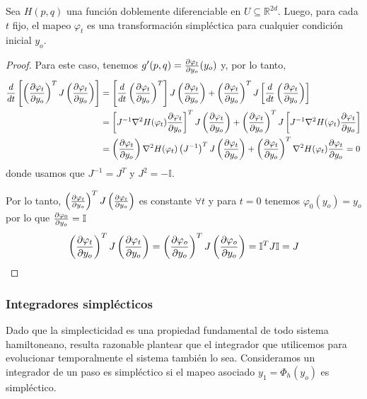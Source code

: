 \begin{theorem}{\label{teo:preservacion_evol}}
  Sea $H(p,q)$ una función doblemente diferenciable en $U\subseteq\mathbb{R}^{2d}$. Luego, para cada $t$ fijo, el mapeo $\varphi_t$ es una transformación simpléctica
  para cualquier condición inicial $y_o$.
\end{theorem}
\begin{proof}
 Para este caso, tenemos $g'(p,q) = \frac{\partial\varphi_t}{\partial y_o}(y_o)$ y, por lo tanto,
 \begin{align*}
  \frac{d}{dt}\left[ \left(\frac{\partial\varphi_t}{\partial y_o}\right)^T J \left(\frac{\partial\varphi_t}{\partial y_o}\right) \right] 
  &= \left[\frac{d}{dt}\left(\frac{\partial\varphi_t}{\partial y_o}\right)^T\right] J \left(\frac{\partial\varphi_t}{\partial y_o}\right) + \left(\frac{\partial\varphi_t}{\partial y_o}\right)^T J \left[\frac{d}{dt}\left(\frac{\partial\varphi_t}{\partial y_o}\right)\right] \\
  &= \left[J^{-1} \nabla^2 H(\varphi_t)\frac{\partial\varphi_t}{\partial y_o}\right]^T J \left(\frac{\partial\varphi_t}{\partial y_o}\right) + \left(\frac{\partial\varphi_t}{\partial y_o}\right)^T J \left[J^{-1} \nabla^2 H(\varphi_t)\frac{\partial\varphi_t}{\partial y_o}\right] \\  
  &= \left(\frac{\partial\varphi_t}{\partial y_o}\right)\nabla^2 H(\varphi_t)\left(J^{-1} \right)^T J \left(\frac{\partial\varphi_t}{\partial y_o}\right) + \left(\frac{\partial\varphi_t}{\partial y_o}\right)^T \nabla^2 H(\varphi_t)\frac{\partial\varphi_t}{\partial y_o} = 0 
 \end{align*}
 donde usamos que $J^{-1} = J^T$ y $J^2 = -\mathbb{I}$.
 
 Por lo tanto, $\left(\frac{\partial\varphi_t}{\partial y_o}\right)^T J \left(\frac{\partial\varphi_t}{\partial y_o}\right)$ es constante $\forall t$ y para $t=0$ tenemos $\varphi_0(y_o) = y_o$ por lo que $\frac{\partial\varphi_0}{\partial y_o}=\mathbb{I}$
 \[ \left(\frac{\partial\varphi_t}{\partial y_o}\right)^T J \left(\frac{\partial\varphi_t}{\partial y_o}\right) = \left(\frac{\partial\varphi_o}{\partial y_o}\right)^T J \left(\frac{\partial\varphi_o}{\partial y_o}\right) = \mathbb{I}^T J \mathbb{I} = J\]
\end{proof}


\subsubsection{Integradores simplécticos}{\label{sec:int_simpl}}

Dado que la simplecticidad es una propiedad fundamental de todo sistema hamiltoneano, resulta razonable plantear que el integrador que utilicemos para evolucionar temporalmente 
el sistema también lo sea. 
Consideramos un integrador de un paso es simpléctico si el mapeo asociado $y_1=\Phi_h(y_o)$ es simpléctico. 

